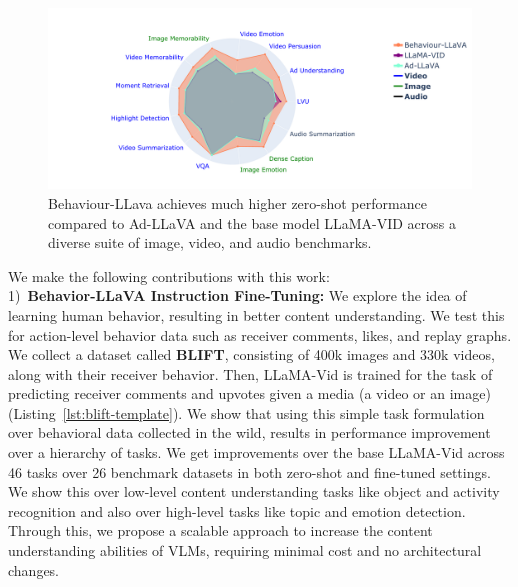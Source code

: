 

\begin{figure}
    \centering
 \includegraphics[width=0.9\linewidth]{images/radar_chart.pdf}
\vspace*{-10pt}    
\caption{Behaviour-LLava achieves much higher zero-shot performance compared to Ad-LLaVA and the base model LLaMA-VID across a diverse suite of image, video, and audio benchmarks.}
    \label{fig:star-graph}

\end{figure}

We make the following contributions with this work:\vspace{0.1cm}\\
1)~\textbf{Behavior-LLaVA Instruction Fine-Tuning:} We explore the idea of learning human behavior, resulting in better content understanding. We test this for action-level behavior data such as receiver comments, likes, and replay graphs. We collect a dataset called \textbf{BLIFT}, consisting of 400k images and 330k videos, along with their receiver behavior. Then, LLaMA-Vid is trained for the task of predicting receiver comments and upvotes given a media (a video or an image) (Listing~\ref{lst:blift-template}). We show that using this simple task formulation over behavioral data collected in the wild, results in performance improvement over a hierarchy of tasks. We get improvements over the base LLaMA-Vid across 46 tasks over 26 benchmark datasets in both zero-shot and fine-tuned settings. We show this over low-level content understanding tasks like object and activity recognition and also over high-level tasks like topic and emotion detection. 
Through this, we propose a scalable approach to increase the content understanding abilities of VLMs, requiring minimal cost and no architectural changes. 


